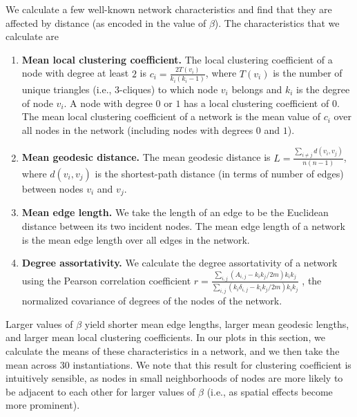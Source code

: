 \documentclass[%
 reprint,
 amsmath,amssymb,
 aps,
]{revtex4-1}
\begin{document}
We calculate a few well-known network characteristics \cite{newman2018} and find that they are affected by distance (as encoded in the value of $\beta$). The characteristics that we calculate are
\begin{enumerate}\label{characteristics_definitions}
    \item {\bf Mean local clustering coefficient.} The local clustering coefficient of a node with degree at least $2$ is $c_i = \frac{2T(v_i)}{k_i(k_i - 1)}$, where $T(v_i)$ is the number of unique triangles (i.e., $3$-cliques) to which node $v_i$ belongs and $k_i$ is the degree of node $v_i$. A node with degree $0$ or $1$ has a local clustering coefficient of $0$. {\color{red}The mean local clustering coefficient of a network is the mean value of $c_i$ over all nodes in the network (including nodes with degrees $0$ and $1$).} 
    \item {\bf Mean geodesic distance.} The mean geodesic distance is  $L = \frac{\sum_{i \neq j}d(v_i, v_j)}{n(n-1)}$, where $d(v_i, v_j)$ is the shortest-path distance (in terms of number of edges) between nodes $v_i$ and $v_j$.
    \item {\bf Mean edge length.} We take the length of an edge to be the Euclidean distance between its two incident nodes. The mean edge length of a network is the mean edge length over all edges in the network.
    \item {\bf Degree assortativity.} We calculate the degree assortativity of a network using {\color{red}the Pearson correlation coefficient} $r = \frac{\sum_{i,j}(A_{i,j}-k_i k_j/2m)k_i k_j}{\sum_{i,j}(k_i \delta_{i,j}-k_i k_j/2m)k_i k_j}$ \cite{newman2018}, the normalized covariance of degrees of the nodes of the network.
\end{enumerate}


Larger values of $\beta$ yield shorter mean edge lengths, larger mean geodesic lengths, and larger mean local clustering coefficients. In our plots in this section, we calculate the means of these characteristics in a network, and we then take the mean across 30 instantiations.
We note that this result for clustering coefficient is intuitively sensible, as nodes in small neighborhoods of nodes are more likely to be adjacent to each other for larger values of $\beta$ (i.e., as spatial effects become more prominent). 
\end{document}
